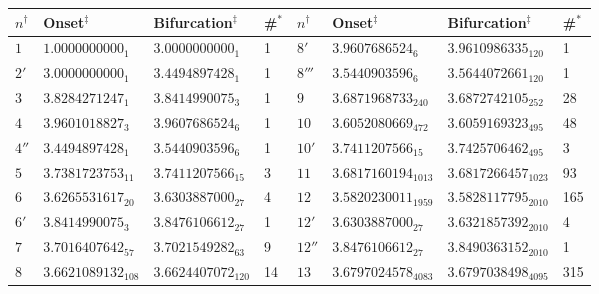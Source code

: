 \documentclass{ws-ijbc}
\begin{document}
\begin{table}[h]\footnotesize
{
\begin{tabular}{llllllll}
\hline
  $n^\dagger$
& Onset$^\ddagger$
& Bifurcation$^\ddagger$
& \#$^*$
&
  $n^\dagger$
& Onset$^\ddagger$
& Bifurcation$^\ddagger$
& \#$^*$ \\
\hline
$1$     & $1.0000000000_1$      &  $3.0000000000_1$       & 1   &
$8'$    & $3.9607686524_{6}$    &  $3.9610986335_{120}$   & 1   \\
$2'$    & $3.0000000000_1$      &  $3.4494897428_1$       & 1   &
$8'''$  & $3.5440903596_{6}$    &  $3.5644072661_{120}$   & 1   \\
$3$     & $3.8284271247_1$      &  $3.8414990075_3$       & 1   &
$9$     & $3.6871968733_{240}$  &  $3.6872742105_{252}$   & 28  \\
$4$     & $3.9601018827_3$      &  $3.9607686524_6$       & 1   &
$10$    & $3.6052080669_{472}$  &  $3.6059169323_{495}$   & 48  \\
$4''$   & $3.4494897428_1$      &  $3.5440903596_6$       & 1   &
$10'$   & $3.7411207566_{15}$   &  $3.7425706462_{495}$   & 3   \\
$5$     & $3.7381723753_{11}$   &  $3.7411207566_{15}$    & 3   &
$11$    & $3.6817160194_{1013}$ &  $3.6817266457_{1023}$  & 93  \\
$6$     & $3.6265531617_{20}$   &  $3.6303887000_{27}$    & 4   &
$12$    & $3.5820230011_{1959}$ &  $3.5828117795_{2010}$  & 165 \\
$6'$    & $3.8414990075_{3}$    &  $3.8476106612_{27}$    & 1   &
$12'$   & $3.6303887000_{27}$   &  $3.6321857392_{2010}$  & 4   \\
$7$     & $3.7016407642_{57}$   &  $3.7021549282_{63}$    & 9   &
$12''$  & $3.8476106612_{27}$   &  $3.8490363152_{2010}$  & 1   \\
$8$     & $3.6621089132_{108}$  &  $3.6624407072_{120}$   & 14  &
$13$    & $3.6797024578_{4083}$ &  $3.6797038498_{4095}$  & 315 \\

\end{tabular}}
\end{table}
\end{document}
